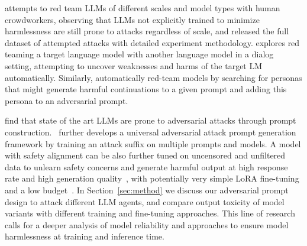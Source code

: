 \citet{ganguli2022red} attempts to red team LLMs of different scales and model types with human crowdworkers, observing that LLMs not explicitly trained to minimize harmlessness are still prone to attacks regardless of scale, and released the full dataset of attempted attacks with detailed experiment methodology. \citet{perez2022red} explores red teaming a target language model with another language model in a dialog setting, attempting to uncover weaknesses and harms of the target LM automatically. Similarly, \citet{shah2023scalable} automatically red-team models by searching for personas that might generate harmful continuations to a given prompt and adding this persona to an adversarial prompt.

\citet{wei2023jailbroken} find that state of the art LLMs are prone to adversarial attacks through prompt construction. \citet{zou2023universal_adv_attacks}~further develops a universal adversarial attack prompt generation framework by training an attack suffix on multiple prompts and models. A model with safety alignment can be also further tuned on uncensored and unfiltered data to unlearn safety concerns and generate harmful output at high response rate and high generation quality~\cite{uncensored}, with potentially very simple LoRA fine-tuning and a low budget~\cite{uncensored2023lora}. In Section~\ref{sec:method} we discuss our adversarial prompt design to attack different LLM agents, and compare output toxicity of model variants with different training and fine-tuning approaches. This line of research calls for a deeper analysis of model reliability and approaches to ensure model harmlessness at training and inference time.

